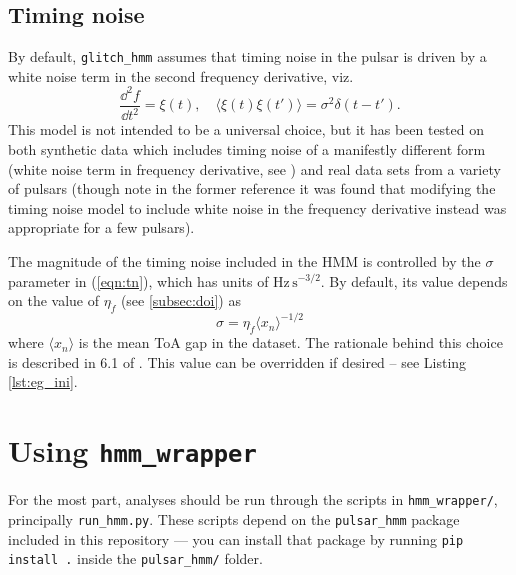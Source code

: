 \documentclass{article}
\newcommand{\glitchhmm}{\texttt{glitch\_hmm}}
\begin{document}
\subsection{Timing noise}
\label{subsec:tn}
By default, \glitchhmm{} assumes that timing noise in the pulsar is driven by a white noise term in the second frequency derivative, viz. \begin{equation} \frac{\dd^2f}{\dd t^2} = \xi(t),\quad \langle\xi(t)\xi(t')\rangle = \sigma^2\delta(t-t').\label{eqn:tn}\end{equation}
This model is not intended to be a universal choice, but it has been tested on both synthetic data which includes timing noise of a manifestly different form (white noise term in frequency derivative, see \citealt{MelatosDunn2020}) and real data sets from a variety of pulsars \citep{Lower2021, DunnMelatos2022} (though note in the former reference it was found that modifying the timing noise model to include white noise in the frequency derivative instead was appropriate for a few pulsars).

The magnitude of the timing noise included in the HMM is controlled by the $\sigma$ parameter in (\ref{eqn:tn}), which has units of $\mathrm{Hz}\,\mathrm{s}^{-3/2}$.
By default, its value depends on the value of $\eta_{\dot{f}}$ (see \ref{subsec:doi}) as \begin{equation} \sigma = \eta_{\dot{f}}\langle x_n\rangle^{-1/2}\end{equation} where $\langle x_n\rangle$ is the mean ToA gap in the dataset.
The rationale behind this choice is described in 6.1 of \citet{MelatosDunn2020}.
This value can be overridden if desired -- see Listing \ref{lst:eg_ini}.


\section{Using \texttt{hmm\_wrapper}}
\label{sec:hmm_wrapper}
For the most part, analyses should be run through the scripts in \texttt{hmm\_wrapper/}, principally \texttt{run\_hmm.py}.
These scripts depend on the \texttt{pulsar\_hmm} package included in this repository --- you can install that package by running \texttt{pip install .} inside the \texttt{pulsar\_hmm/} folder.
\end{document}
